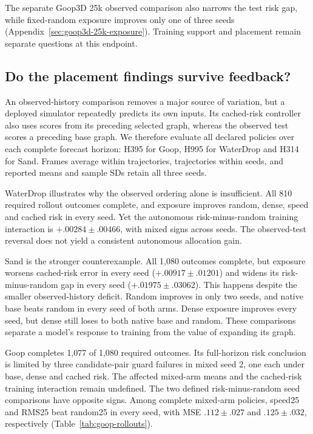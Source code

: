 The separate Goop3D 25k observed comparison also narrows the test risk gap, while fixed-random exposure improves only one of three seeds (Appendix~\ref{sec:goop3d-25k-exposure}). Training support and placement remain separate questions at this endpoint.

\subsection{Do the placement findings survive feedback?}
An observed-history comparison removes a major source of variation, but a deployed simulator repeatedly predicts its own inputs. Its cached-risk controller also uses scores from its preceding selected graph, whereas the observed test scores a preceding base graph. We therefore evaluate all declared policies over each complete forecast horizon: H395 for Goop, H995 for WaterDrop and H314 for Sand. Frames average within trajectories, trajectories within seeds, and reported means and sample SDs retain all three seeds.

WaterDrop illustrates why the observed ordering alone is insufficient. All 810 required rollout outcomes complete, and exposure improves random, dense, speed and cached risk in every seed. Yet the autonomous risk-minus-random training interaction is $+.00284\pm.00466$, with mixed signs across seeds. The observed-test reversal does not yield a consistent autonomous allocation gain.

Sand is the stronger counterexample. All 1,080 outcomes complete, but exposure worsens cached-risk error in every seed ($+.00917\pm.01201$) and widens its risk-minus-random gap in every seed ($+.01975\pm.03062$). This happens despite the smaller observed-history deficit. Random improves in only two seeds, and native base beats random in every seed of both arms. Dense exposure improves every seed, but dense still loses to both native base and random. These comparisons separate a model's response to training from the value of expanding its graph.

Goop completes 1,077 of 1,080 required outcomes. Its full-horizon risk conclusion is limited by three candidate-pair guard failures in mixed seed 2, one each under base, dense and cached risk. The affected mixed-arm means and the cached-risk training interaction remain undefined. The two defined risk-minus-random seed comparisons have opposite signs. Among complete mixed-arm policies, speed25 and RMS25 beat random25 in every seed, with MSE $.112\pm.027$ and $.125\pm.032$, respectively (Table~\ref{tab:goop-rollouts}).

